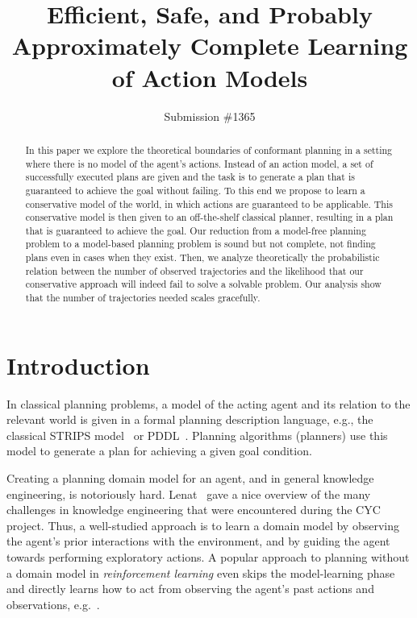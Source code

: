 \documentclass{article}
\title{Efficient, Safe, and Probably Approximately Complete Learning of Action Models}
\author{Submission \#1365}
\newcommand{\roni}[1]{[[Roni:#1]]}
\begin{document}
	
	\maketitle
	
	\begin{abstract}
		In this paper we explore the theoretical boundaries of 
		conformant planning in a setting where 
		there is no model of the agent's actions. 
		Instead of an action model, a set of successfully executed plans are given and the task is to generate a plan that is guaranteed to achieve the goal without failing. 
		To this end we propose to learn a conservative model of the world, in which actions are guaranteed to be applicable. This conservative model is then given to an off-the-shelf classical planner, resulting in a plan that is guaranteed to achieve the goal. 
		Our reduction from a model-free planning problem to a model-based planning problem is sound but not complete, not finding plans even in cases when they exist. 
		Then, we analyze theoretically the probabilistic relation between the number of observed trajectories and the likelihood that our conservative approach will indeed fail to solve a solvable problem. Our analysis show that the number of trajectories needed scales gracefully.
	\end{abstract}
	
	\section{Introduction}
	In classical planning problems, a model of the acting agent and its relation to the relevant world is given in a formal planning description language, e.g., the classical STRIPS model~\cite{fikes1971strips} or PDDL~\cite{mcdermott1998pddl}. Planning algorithms (planners) use this model to generate a plan for achieving a given goal condition. 
	
	Creating a planning domain model for an agent, and in general knowledge engineering, is notoriously hard. %
	Lenat~ gave a nice overview of the many challenges in knowledge engineering that were encountered during the CYC project.
	Thus, a well-studied approach is to learn a domain model by observing the agent's prior interactions with the environment, and by guiding the agent towards performing exploratory actions. A popular approach to planning without a domain model in {\em reinforcement learning} even skips the model-learning phase and directly learns how to act from observing the agent's past actions and observations, e.g.~\cite{kearns2002}. 
\end{document}

